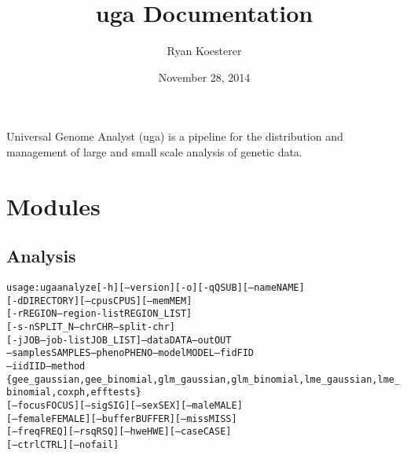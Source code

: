 \documentclass[letterpaper,10pt,english]{sphinxmanual}
\title{uga Documentation}
\date{November 28, 2014}
\author{Ryan Koesterer}
\begin{document}
\maketitle
\tableofcontents
{}\label{index::doc}


Universal Genome Analyst (uga) is a pipeline for the distribution and
management of large and small scale analysis of genetic data.


\chapter{Modules}
\label{index:universal-genome-analyst}\label{index:modules}

\section{Analysis}
\label{analyze::doc}\label{analyze:analysis}\begin{alltt}
usage: uga analyze {[}-h{]} {[}--version{]} {[}-o{]} {[}-q QSUB{]} {[}--name NAME{]}
                   {[}-d DIRECTORY{]} {[}--cpus CPUS{]} {[}--mem MEM{]}
                   {[}-r REGION \textbar{} --region-list REGION\_LIST{]}
                   {[}-s \textbar{} -n SPLIT\_N \textbar{} --chr CHR \textbar{} --split-chr{]}
                   {[}-j JOB \textbar{} --job-list JOB\_LIST{]} --data DATA --out OUT
                   --samples SAMPLES --pheno PHENO --model MODEL --fid FID
                   --iid IID --method
                   \{gee\_gaussian,gee\_binomial,glm\_gaussian,glm\_binomial,lme\_gaussian,lme\_binomial,coxph,efftests\}
                   {[}--focus FOCUS{]} {[}--sig SIG{]} {[}--sex SEX{]} {[}--male MALE{]}
                   {[}--female FEMALE{]} {[}--buffer BUFFER{]} {[}--miss MISS{]}
                   {[}--freq FREQ{]} {[}--rsq RSQ{]} {[}--hwe HWE{]} {[}--case CASE{]}
                   {[}--ctrl CTRL{]} {[}--nofail{]}
\end{alltt}
\end{document}
